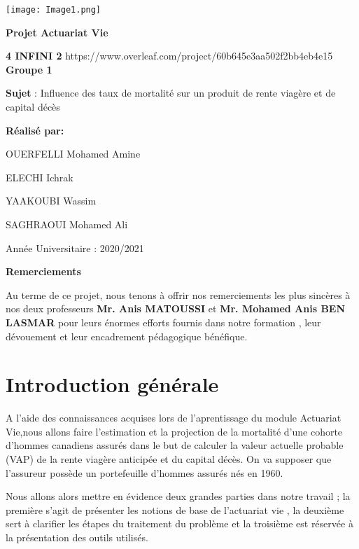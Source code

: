\documentclass{article}
\begin{document}
\texttt{[image: Image1.png]}

\begin{center}
    {\huge \textbf{Projet Actuariat Vie}}
     
      \textbf{\huge 4 INFINI 2 }
       https://www.overleaf.com/project/60b645e3aa502f2bb4eb4e15
        {\huge \textbf{Groupe 1}}
     	\begin{singlespace} 
        {\huge \textbf{Sujet} : Influence des taux de mortalité sur un produit de rente viagère et de capital décès }\
         \end{singlespace}
       {\huge \textbf{Réalisé par:}}
     
      {\huge OUERFELLI Mohamed Amine}
      
      {\huge ELECHI Ichrak }
   
      {\huge YAAKOUBI  Wassim}
      
      {\huge SAGHRAOUI Mohamed Ali}
      
      {\Large Année Universitaire : 2020/2021}
\end{center}
\newpage
\begin{center}
    {\huge \textbf{Remerciements}}
\end{center}


{\Large Au terme de ce projet, nous tenons à offrir nos remerciements les plus sincères à nos deux professeurs\textbf{ Mr. Anis MATOUSSI} et\textbf{ Mr. Mohamed Anis BEN LASMAR} pour leurs énormes efforts fournis dans notre formation , leur dévouement et leur encadrement pédagogique bénéfique.}
    
\newpage
{}
\tableofcontents
\newpage
\section{Introduction générale}
{\large A l'aide des connaissances acquises lors de l'aprentissage du module Actuariat Vie,nous allons faire l'estimation et la projection de la mortalité d'une cohorte d'hommes canadiens assurés dans le but de calculer la valeur actuelle probable (VAP) de la rente viagère anticipée et du capital décès. On va supposer que l'assureur possède un portefeuille d'hommes assurés nés en 1960.}


{\large Nous allons alors mettre en évidence deux grandes parties dans notre travail ; la première s'agit de présenter les notions de base de l'actuariat vie , la deuxième sert à clarifier les étapes du traitement du problème et la troisième est réservée à la présentation des outils utilisés.}
\newpage
\end{document}
